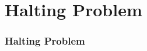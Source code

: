 \documentclass[mathserif]{beamer}
\begin{document}
\section{Halting Problem}
\begin{frame}
  \frametitle{Halting Problem}

\end{frame}
\end{document}
